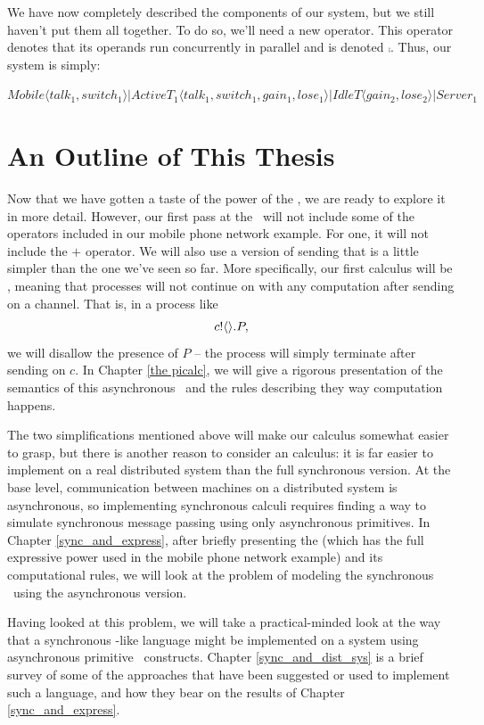 We have now completely described the components of our system, but we still haven't put them all together.  
To do so, we'll need a new operator.  
This operator denotes that its operands run concurrently in parallel and is denoted $\comp$.  
Thus, our system is simply:
\begin{center}
	\small{$\textstyle Mobile\langle talk_1,switch_1\rangle|ActiveT_1\langle talk_1,switch_1,gain_1,lose_1\rangle|IdleT\langle gain_2,lose_2\rangle|Server_1$}
\end{center}

\section{An Outline of This Thesis}	
	Now that we have gotten a taste of the power of the \picalc, we are ready to explore it in more detail.  
However, our first pass at the \picalc\ will not include some of the operators included in our mobile phone network example.  
For one, it will not include the $+$ operator.  
We will also use a version of sending that is a little simpler than the one we've seen so far.  
More specifically, our first calculus will be , meaning that processes will not continue on with any computation after sending on a channel.  
That is, in a process like
\[
	{c}!\langle{}\rangle.P,
\]
we will disallow the presence of $P$ -- the process will simply terminate after sending on $c$.  
In Chapter \ref{the picalc}, we will give a rigorous presentation of the semantics of this asynchronous \picalc\ and the rules describing they way computation happens.

The two simplifications mentioned above will make our calculus somewhat easier to grasp, but there is another reason to consider an  calculus: it is far easier to implement on a real distributed system than the full synchronous version.  
At the base level, communication between machines on a distributed system is asynchronous, so implementing synchronous calculi requires finding a way to simulate synchronous message passing using only asynchronous primitives.  
In Chapter \ref{sync_and_express}, after briefly presenting the  \picalc (which has the full expressive power used in the mobile phone network example) and its computational rules, we will look at the problem of modeling the synchronous \picalc\ using the asynchronous version.

Having looked at this problem, we will take a practical-minded look at the way that a synchronous \picalc-like language might be implemented on a system using asynchronous primitive \picalc\ constructs. 
Chapter \ref{sync_and_dist_sys} is a brief survey of some of the approaches that have been suggested or used to implement such a language, and how they bear on the results of Chapter \ref{sync_and_express}.